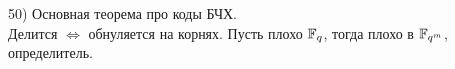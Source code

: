 50) Основная теорема про коды БЧХ.\\

Делится $\Leftrightarrow$ обнуляется на корнях. Пусть плохо $\mathbb{F}_q$, тогда плохо в $\mathbb{F}_{q^m}$, определитель.\\
